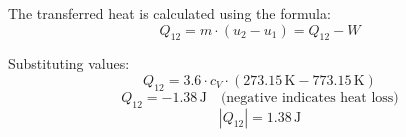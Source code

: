 The transferred heat is calculated using the formula:  
\[
Q_{12} = m \cdot (u_2 - u_1) = Q_{12} - W
\]  

Substituting values:  
\[
Q_{12} = 3.6 \cdot c_V \cdot (273.15 \, \text{K} - 773.15 \, \text{K})
\]  
\[
Q_{12} = -1.38 \, \text{J} \quad \text{(negative indicates heat loss)}
\]  
\[
|Q_{12}| = 1.38 \, \text{J}
\]